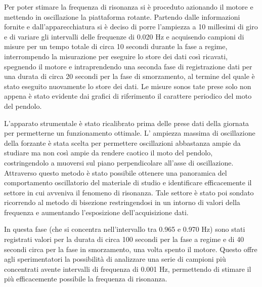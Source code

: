 Per poter stimare la frequenza di risonanza si è proceduto azionando il motore e mettendo in oscillazione la piattaforma rotante.
Partendo dalle informazioni fornite e dall’apparecchiatura si è deciso di porre l’ampiezza a 10 millesimi di giro e di variare gli
intervalli delle frequenze di 0.020 Hz e acquisendo campioni di misure per un tempo totale di circa 10 secondi durante la fase a
regime, interrompendo la misurazione per eseguire lo store dei dati così ricavati, spegnendo il motore e intraprendendo una seconda
fase di registrazione dati per una durata di circa 20 secondi per la fase di smorzamento, al termine del quale è stato  eseguito
nuovamente lo store dei dati. Le misure sonos tate prese solo non appena è stato evidente dai grafici di riferimento il carattere
periodico del moto del pendolo. 

L'apparato strumentale è stato ricalibrato prima delle prese dati della giornata per permetterne un
funzionamento ottimale. L' ampiezza massima di oscillazione della forzante è stata scelta per permettere oscillazioni abbastanza
ampie da studiare ma non così ampie da rendere caotico il moto del pendolo, costringendolo a muoversi sul piano perpendicolare
all'asse di oscillazione. Attraverso questo metodo è stato possibile ottenere una panoramica del comportamento oscillatorio del 
materiale di studio e identificare efficacemente il settore in cui avveniva il fenomeno di risonanza. Tale settore è stato poi 
sondato ricorrendo al metodo di bisezione restringendosi in un intorno di valori della frequenza e aumentando l’esposizione 
dell’acquisizione dati. 

In questa fase (che si concentra nell’intervallo tra 0.965 e 0.970 Hz) sono stati registrati valori per la durata di circa 100
secondi per la fase a regime e di 40 secondi circa per la fase in smorzamento, una volta spento il motore. Questo offre agli
sperimentatori la possibilità di analizzare una serie di campioni più concentrati avente intervalli di frequenza di 0.001 Hz,
permettendo di stimare il più efficacemente possibile la frequenza di risonanza.
